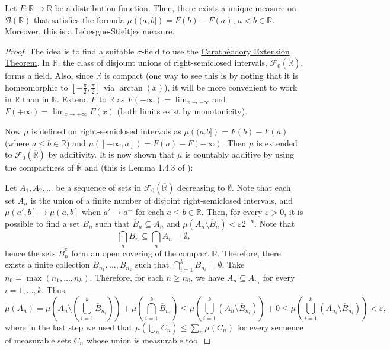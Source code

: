 \begin{thrm}\label{theorem:Lebesgue-Stieltjes}
		Let \(F\colon\mathbb{R}\to\mathbb{R}\) be a distribution function. Then, there exists a unique measure on \(\mathscr{B}\left(\mathbb{R}\right)\) that satisfies the formula \(\mu\left( (a,b]\right)=F(b)-F(a)\), \(a<b\in\mathbb{R}\). Moreover, this is a Lebesgue-Stieltjes measure.
\end{thrm}
\begin{proof}
The idea is to find a suitable \(\sigma\)-field to use the \hyperref[theorem:Caratheodry Extension]{Carathéodory Extension Theorem}. In \(\overline{\mathbb{R}}\), the class of disjount unions of right-semiclosed intervals, \(\mathcal{F}_0(\overline{\mathbb{R}})\), forms a field. Also, since \(\overline{\mathbb{R}}\) is compact (one way to see this is by noting that it is homeomorphic to \(\left[-\frac{\pi}{2},\frac{\pi}{2}\right]\) via \(\arctan(x)\)), it will be more convenient to work in \(\overline{\mathbb{R}}\) than in \(\mathbb{R}\). Extend \(F\) to \(\overline{\mathbb{R}}\) as \(F(-\infty)=\lim_{x\to-\infty}\)and \(F(+\infty)=\lim_{x\to+\infty}F(x)\) (both limits exist by monotonicity).

Now \(\mu\) is defined on right-semiclosed intervals as \(\mu\left( (a.b]\right)=F(b)-F(a)\) (where \(a\leq b\in\overline{\mathbb{R}}\)) and \(\mu([-\infty,a])=F(a)-F(-\infty)\). Then \(\mu\) is extended to \(\mathcal{F}_0(\overline{\mathbb{R}})\) by additivity. It is now shown that \(\mu\) is countably additive by using the compactness of \(\overline{\mathbb{R}}\) and  (this is Lemma 1.4.3 of \cite{ash1972real}):

Let \(A_1,A_2,\dots\) be a sequence of sets in \(\mathcal{F}_0(\overline{\mathbb{R}})\) decreasing to \(\emptyset\). Note that each set \(A_n\) is the union of a finite number of disjoint right-semiclosed intervals, and \(\mu\left(a',b\right]\to\mu\left(a,b\right]\) when \(a'\to a^+\) for each \(a\leq b\in\overline{\mathbb{R}}\). Then, for every \(\varepsilon>0\), it is possible to find a set \(B_n\) such that \(\overline{B}_n\subseteq A_n\) and \(\mu\left(A_n\setminus\overline{B}_n\right)<\varepsilon 2^{-n}
\). Note that
\[
		\bigcap_{n}\overline{B}_n\subseteq\bigcap_{n}A_n=\emptyset
,\]
hence the sets \(\overline{B}_n^c\) form an open covering of the compact \(\overline{\mathbb{R}}\). Therefore, there exists a finite collection \(\overline{B}_{n_{1}}, \dots , \overline{B}_{n_{k}}\) such that \(\bigcap_{i=1}^k\overline{B}_{n_i}=\emptyset\). Take \(n_0=\max(n_1,\dots,n_k)\). Therefore, for each \(n\geq n_0\), we have \(A_n\subseteq A_{n_i}\) for every \(i=1,\dots,k\). Thus,
\[
		\mu(A_n)=\mu\left(A_n\setminus\left(\bigcup_{i=1}^k\overline{B}_{n_i}\right)\right)+\mu\left(\bigcap_{i=1}^k\overline{B}_{n_i}\right)\leq\mu\left(\bigcup_{i=1}^k\left(A_n\setminus\overline{B}_{n_i}\right)\right)+0\leq\mu\left(\bigcup_{i=1}^k\left(A_{n_i}\setminus\overline{B}_{n_i}\right)\right)<\varepsilon
,\]
where in the last step we used that \(\mu\left(\bigcup_{n}C_n\right)\leq\sum_{n} \mu(C_n)\) for every sequence of measurable sets \(C_n\) whose union is measurable too. 


\end{proof}
